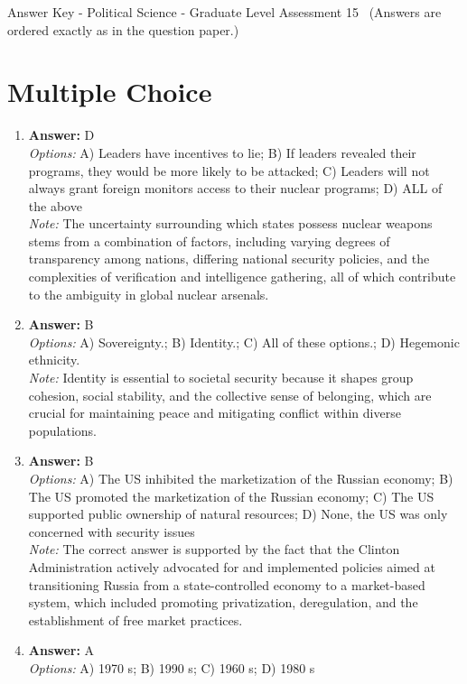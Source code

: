 \documentclass[12pt]{article}
\begin{document}
\begin{center}
Answer Key - Political Science - Graduate Level Assessment 15 \
\small (Answers are ordered exactly as in the question paper.)
\end{center}

\section*{Multiple Choice}
\begin{enumerate}[label=\arabic*.]
\item \textbf{Answer:} D
\\ \textit{Options:} A) Leaders have incentives to lie; B) If leaders revealed their programs, they would be more likely to be attacked; C) Leaders will not always grant foreign monitors access to their nuclear programs; D) ALL of the above
\\ \textit{Note:} The uncertainty surrounding which states possess nuclear weapons stems from a combination of factors, including varying degrees of transparency among nations, differing national security policies, and the complexities of verification and intelligence gathering, all of which contribute to the ambiguity in global nuclear arsenals.
\item \textbf{Answer:} B
\\ \textit{Options:} A) Sovereignty.; B) Identity.; C) All of these options.; D) Hegemonic ethnicity.
\\ \textit{Note:} Identity is essential to societal security because it shapes group cohesion, social stability, and the collective sense of belonging, which are crucial for maintaining peace and mitigating conflict within diverse populations.
\item \textbf{Answer:} B
\\ \textit{Options:} A) The US inhibited the marketization of the Russian economy; B) The US promoted the marketization of the Russian economy; C) The US supported public ownership of natural resources; D) None, the US was only concerned with security issues
\\ \textit{Note:} The correct answer is supported by the fact that the Clinton Administration actively advocated for and implemented policies aimed at transitioning Russia from a state-controlled economy to a market-based system, which included promoting privatization, deregulation, and the establishment of free market practices.
\item \textbf{Answer:} A
\\ \textit{Options:} A) 1970 s; B) 1990 s; C) 1960 s; D) 1980 s

\end{enumerate}
\end{document}
